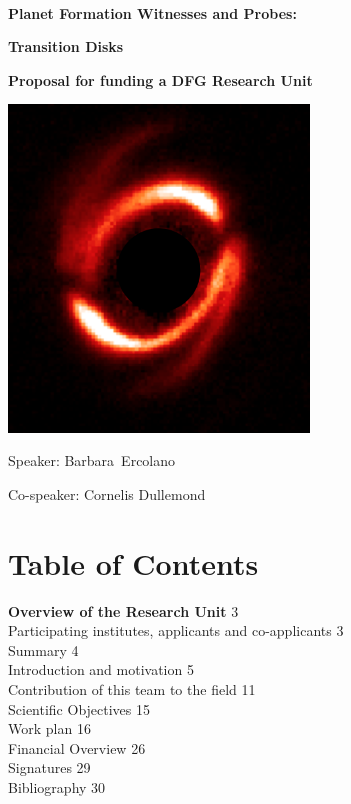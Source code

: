 \documentclass[10pt,fleqn,twoside]{article}
\newcommand{\Titlecol}{\color{Black}}
\begin{document}
\pagestyle{empty}
\mbox{}
\vspace{1cm}\\

\centerline{\Titlecol\huge \bf Planet Formation Witnesses and Probes:}
\vspace{0.5cm}
\centerline{\Titlecol\huge \bf Transition Disks}
\vspace{2cm}
\centerline{\Titlecol\Large \bf Proposal for funding a DFG Research Unit}
\vspace{2cm}
\centerline{\includegraphics[width=0.6\textwidth]{figures/HD100453.png}}
\vspace{1cm}
\centerline{\Large Speaker: Barbara~Ercolano}
\vspace{0.5cm}
\centerline{\Large Co-speaker: Cornelis Dullemond}


\pagebreak[4]

\mbox{}
\section*{Table of Contents}
 {\bf Overview of the Research Unit} \hfill 3\\
 Participating institutes,  applicants and co-applicants \hfill 3\\
Summary \hfill 4 \\
Introduction and motivation \hfill 5 \\
Contribution of this team to the field \hfill 11 \\
Scientific Objectives \hfill 15 \\
Work plan \hfill 16 \\
Financial Overview \hfill 26 \\
Signatures \hfill 29 \\
Bibliography \hfill 30 \\
\end{document}
